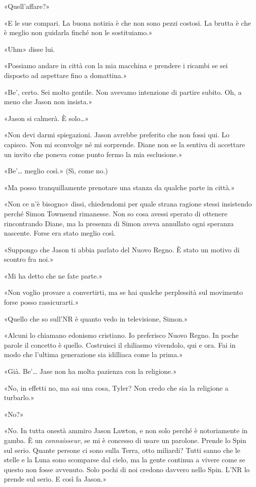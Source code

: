 «Quell'affare?»

«E le sue compari. La buona notizia è che non sono pezzi costosi. La
brutta è che è meglio non guidarla finché non le sostituiamo.»

«Uhm» disse lui.

«Possiamo andare in città con la mia macchina e prendere i ricambi se
sei disposto ad aspettare fino a domattina.»

«Be', certo. Sei molto gentile. Non avevamo intenzione di partire
subito. Oh, a meno che Jason non insista.»

«Jason si calmerà. È solo\ldots»

«Non devi darmi spiegazioni. Jason avrebbe preferito che non fossi qui.
Lo capisco. Non mi sconvolge né mi sorprende. Diane non se la sentiva di
accettare un invito che poneva come punto fermo la mia esclusione.»

«Be'\ldots{} meglio così.» (Sì, come no.)

«Ma posso tranquillamente prenotare una stanza da qualche parte in
città.»

«Non ce n'è bisogno» dissi, chiedendomi per quale strana ragione stessi
insistendo perché Simon Townsend rimanesse. Non so cosa avessi sperato
di ottenere rincontrando Diane, ma la presenza di Simon aveva annullato
ogni speranza nascente. Forse era stato meglio così.

«Suppongo che Jason ti abbia parlato del Nuovo Regno. È stato un motivo
di scontro fra noi.»

«Mi ha detto che ne fate parte.»

«Non voglio provare a convertirti, ma se hai qualche perplessità sul
movimento forse posso rassicurarti.»

«Quello che so sull'NR è quanto vedo in televisione, Simon.»

«Alcuni lo chiamano edonismo cristiano. Io preferisco Nuovo Regno. In
poche parole il concetto è quello. Costruisci il chiliasmo vivendolo,
qui e ora. Fai in modo che l'ultima generazione sia idilliaca come la
prima.»

«Già. Be'\ldots{} Jase non ha molta pazienza con la religione.»

«No, in effetti no, ma sai una cosa, Tyler? Non credo che sia la
religione a turbarlo.»

«No?»

«No. In tutta onestà ammiro Jason Lawton, e non solo perché è
notoriamente in gamba. È un \emph{connaisseur}, se mi è concesso di
usare un parolone. Prende lo Spin sul serio. Quante persone ci sono
sulla Terra, otto miliardi? Tutti sanno che le stelle e la Luna sono
scomparse dal cielo, ma la gente continua a vivere come se questo non
fosse avvenuto. Solo pochi di noi credono davvero nello Spin. L'NR lo
prende sul serio. E così fa Jason.»

